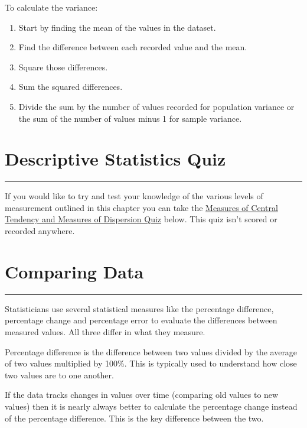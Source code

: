 \documentclass[
]{book}
\providecommand{\tightlist}{%
  \setlength{\itemsep}{0pt}\setlength{\parskip}{0pt}}
\begin{document}
To calculate the variance:

\begin{enumerate}
\def\labelenumi{\arabic{enumi}.}
\tightlist
\item
  Start by finding the mean of the values in the dataset.
\item
  Find the difference between each recorded value and the mean.
\item
  Square those differences.
\item
  Sum the squared differences.
\item
  Divide the sum by the number of values recorded for population variance or the sum of the number of values minus 1 for sample variance.
\end{enumerate}

\hypertarget{quiztwo}{%
\chapter{Descriptive Statistics Quiz}\label{quiztwo}}

\begin{center}\rule{0.5\linewidth}{0.5pt}\end{center}

If you would like to try and test your knowledge of the various levels of measurement outlined in this chapter you can take the \href{https://view.genial.ly/628a683cb8b7d200114d12a0/presentation-quiz-on-measures}{Measures of Central Tendency and Measures of Dispersion Quiz} below. This quiz isn't scored or recorded anywhere.

\hypertarget{compdat}{%
\chapter{Comparing Data}\label{compdat}}

\begin{center}\rule{0.5\linewidth}{0.5pt}\end{center}

Statisticians use several statistical measures like the percentage difference, percentage change and percentage error to evaluate the differences between measured values. All three differ in what they measure.

Percentage difference is the difference between two values divided by the average of two values multiplied by 100\%. This is typically used to understand how close two values are to one another.

If the data tracks changes in values over time (comparing old values to new values) then it is nearly always better to calculate the percentage change instead of the percentage difference. This is the key difference between the two.
\end{document}
